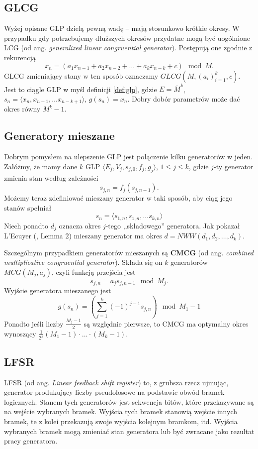 \documentclass[a4paper,11pt,twoside]{book}
\theoremstyle{definition}
\begin{document}
\subsection*{GLCG}
Wyżej opisane GLP dzielą pewną wadę -- mają stosunkowo krótkie okresy. W przypadku gdy potrzebujemy dłuższych okresów przydatne mogą być uogólnione LCG (od ang. \textit{generalized linear congruential generator}). Postępują one zgodnie z rekurencją
\begin{equation}
 \label{eq:glcg}
 x_n = (a_1 x_{n-1} + a_2 x_{n-2} + \ldots + a_k x_{n-k} + c) \mod M.
\end{equation}
GLCG zmieniający stany w ten sposób oznaczamy $GLCG(M, (a_i)_{i=1}^k, c)$. Jest to ciągle GLP w myśl definicji \ref{def:glp}, gdzie $E = \bar{M}^k$, $s_n = \langle x_n, x_{n-1}, \ldots  x_{n-k+1} \rangle$, $g(s_n) = x_n$. Dobry dobór parametrów może dać okres równy $M^k-1$.

\subsection*{Generatory mieszane}
Dobrym pomysłem na ulepszenie GLP jest połączenie kilku generatorów w jeden. Załóżmy, że mamy dane $k$ GLP $\langle E_j, V_j, s_{j,0}, f_j, g_j \rangle$, $1 \leq j \leq k$, gdzie $j$-ty generator zmienia stan według zależności 
\[ s_{j,n} = f_j(s_{j,n-1}). \]
Możemy teraz zdefiniować mieszany generator w taki sposób, aby ciąg jego stanów spełniał
\[ s_n = \langle s_{1,n}, s_{1,n}, \ldots s_{k,n} \rangle\]
Niech ponadto $d_j$ oznacza okres $j$-tego ,,składowego'' generatora. Jak pokazał L'Ecuyer (\cite{lecuyer}, Lemma 2) mieszany generator ma okres $d = NWW(d_1, d_2,\ldots,d_k)$.

Szczególnym przypadkiem generatorów mieszanych są \textbf{CMCG} (od ang. \textit{combined multiplicative congruential generator}). Składa się on $k$ generatorów $MCG(M_j, a_j)$, czyli funkcją przejścia jest
\[ s_{j,n} = a_j s_{j,n-1} \mod M_j. \]
Wyjście generatora mieszanego jest
\[ g(s_n) = \left( \sum_{j=1}^{k} (-1)^{j-1} s_{j,n} \right) \mod M_1 - 1\]
Ponadto jeśli liczby $\frac{M_j-1}{2}$ są względnie pierwsze, to CMCG ma optymalny okres wynoszący $\frac{1}{2^k}(M_1-1)\cdot \ldots \cdot (M_k-1)$.

\subsection*{LFSR}
LFSR (od ang. \textit{Linear feedback shift register}) to, z grubsza rzecz ujmując, generator produkujący liczby pseudolosowe na podstawie obwód bramek logicznych. Stanem tych generatorów jest sekwencja bitów, które przekazywane są na wejście wybranych bramek. Wyjścia tych bramek stanowią wejście innych bramek, te z kolei przekazują swoje wyjścia kolejnym bramkom, itd. Wyjścia wybranych bramek mogą zmieniać stan generatora lub być zwracane jako rezultat pracy generatora. 
\end{document}
